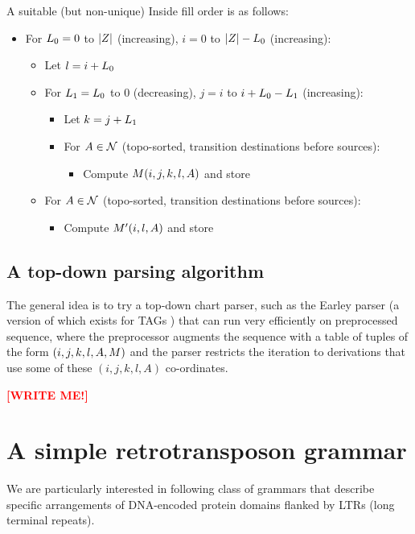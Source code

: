 \documentclass[10pt]{article}
\newcommand{\seclabel}[1]{\label{sec:#1}}
\newcommand\redpen[1]{{\bf \textcolor{red}{#1}} \textcolor{black}{}}
\newcommand\writeme{\redpen{\bf [WRITE ME!]}}
\begin{document}
A suitable (but non-unique) Inside fill order is as follows:
\begin{itemize}
 \item For $L_0 = 0$ to $|Z|$ (increasing), \quad $i = 0$ to $|Z|-L_0$ (increasing):
 \begin{itemize}
  \item Let $l = i + L_0$
  \item For $L_1 = L_0$ to $0$ (decreasing), \quad $j = i$ to $i + L_0 - L_1$ (increasing):
  \begin{itemize}
   \item Let $k = j + L_1$
   \item For $A \in {\cal N}$ (topo-sorted, transition destinations before sources):
   \begin{itemize}
    \item Compute $M(i,j,k,l,A)$ and store
   \end{itemize}
  \end{itemize}
  \item For $A \in {\cal N}$ (topo-sorted, transition destinations before sources):
  \begin{itemize}
   \item Compute $M'(i,l,A)$ and store
  \end{itemize}
 \end{itemize}
\end{itemize}


\subsection{A top-down parsing algorithm}
\seclabel{TopDownParser}

The general idea is to try a top-down chart parser, such as the Earley parser \cite{Earley70}
(a version of which exists for TAGs \cite{kallmeyer2010parsing})
that can run very efficiently on preprocessed sequence,
where the preprocessor augments the sequence with a table of tuples of the form $(i,j,k,l,A,M)$
and the parser restricts the iteration to derivations that use some of these $(i,j,k,l,A)$ co-ordinates.

\writeme

\section{A simple retrotransposon grammar}
\seclabel{RetroGrammar}

We are particularly interested in following class of grammars that describe specific arrangements of DNA-encoded protein domains flanked by LTRs (long terminal repeats).
\end{document}
